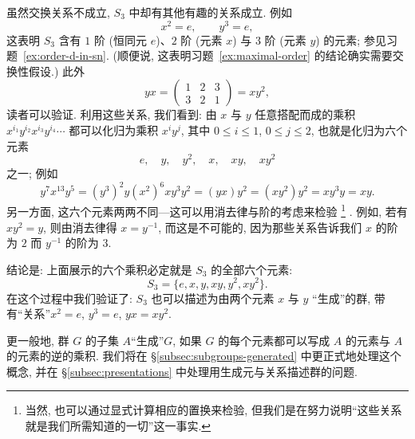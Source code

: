 虽然交换关系不成立, $S_3$ 中却有其他有趣的关系成立. 例如
\[
x^2 = e, \qquad y^3 = e,
\]
这表明 $S_3$ 含有 $1$ 阶 (恒同元 $e$)、$2$ 阶 (元素 $x$) 与 $3$ 阶 (元素 $y$) 的元素; 参见习题~\ref{ex:order-d-in-sn}. (顺便说, 这表明习题~\ref{ex:maximal-order} 的结论确实需要交换性假设.) 此外
\[
yx = \begin{pmatrix} 1 & 2 & 3 \\ 3 & 2 & 1 \end{pmatrix} = xy^2,
\]
读者可以验证. 利用这些关系, 我们看到: 由 $x$ 与 $y$ 任意搭配而成的乘积 $x^{i_1} y^{i_2} x^{i_3} y^{i_4} \cdots$ 都可以化归为乘积 $x^i y^j$, 其中 $0 \leq i \leq 1$, $0 \leq j \leq 2$, 也就是化归为六个元素
\[
e, \quad y, \quad y^2, \quad x, \quad xy, \quad xy^2
\]
之一; 例如
\[
y^7 x^{13} y^5 = (y^3)^2 y (x^2)^6 x y^3 y^2 = (yx) y^2 = (xy^2) y^2 = x y^3 y = xy.
\]
另一方面, 这六个元素两两不同---这可以用消去律与阶的考虑来检验%
\footnote{当然, 也可以通过显式计算相应的置换来检验, 但我们是在努力说明``这些关系就是我们所需知道的一切''这一事实.}%
. 例如, 若有 $xy^2 = y$, 则由消去律得 $x = y^{-1}$, 而这是不可能的, 因为那些关系告诉我们 $x$ 的阶为 $2$ 而 $y^{-1}$ 的阶为 $3$.

结论是: 上面展示的六个乘积必定就是 $S_3$ 的全部六个元素:
\[
S_3 = \{e, x, y, xy, y^2, xy^2\}.
\]
在这个过程中我们验证了: $S_3$ 也可以描述为由两个元素 $x$ 与 $y$ ``生成''的群, 带有``关系''$x^2 = e$, $y^3 = e$, $yx = xy^2$.

更一般地, 群 $G$ 的子集 $A$``生成''$G$, 如果 $G$ 的每个元素都可以写成 $A$ 的元素与 $A$ 的元素的逆的乘积. 我们将在 \S\ref{subsec:subgroups-generated} 中更正式地处理这个概念, 并在 \S\ref{subsec:presentations} 中处理用生成元与关系描述群的问题.

